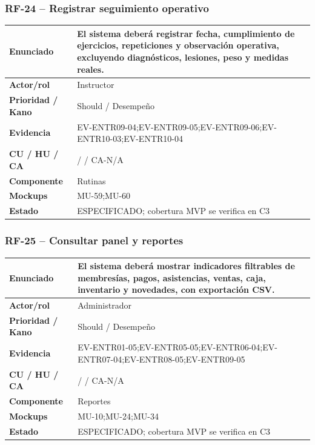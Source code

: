 \documentclass[11pt,a4paper,twoside]{article}
\begin{document}
\subsubsection{RF-24 -- Registrar seguimiento operativo}
\begin{tabularx}{\textwidth}{|>{\bfseries}p{3.2cm}|X|}\hline
Enunciado & El sistema deberá registrar fecha, cumplimiento de ejercicios, repeticiones y observación operativa, excluyendo diagnósticos, lesiones, peso y medidas reales. \\ \hline
Actor/rol & Instructor \\ \hline
Prioridad / Kano & Should / Desempeño \\ \hline
Evidencia & EV-ENTR09-04;EV-ENTR09-05;EV-ENTR09-06;EV-ENTR10-03;EV-ENTR10-04 \\ \hline
CU / HU / CA &  /  / CA-N/A \\ \hline
Componente & Rutinas \\ \hline
Mockups & MU-59;MU-60 \\ \hline
Estado & ESPECIFICADO; cobertura MVP se verifica en C3 \\ \hline
\end{tabularx}
\subsubsection{RF-25 -- Consultar panel y reportes}
\begin{tabularx}{\textwidth}{|>{\bfseries}p{3.2cm}|X|}\hline
Enunciado & El sistema deberá mostrar indicadores filtrables de membresías, pagos, asistencias, ventas, caja, inventario y novedades, con exportación CSV. \\ \hline
Actor/rol & Administrador \\ \hline
Prioridad / Kano & Should / Desempeño \\ \hline
Evidencia & EV-ENTR01-05;EV-ENTR05-05;EV-ENTR06-04;EV-ENTR07-04;EV-ENTR08-05;EV-ENTR09-05 \\ \hline
CU / HU / CA &  /  / CA-N/A \\ \hline
Componente & Reportes \\ \hline
Mockups & MU-10;MU-24;MU-34 \\ \hline
Estado & ESPECIFICADO; cobertura MVP se verifica en C3 \\ \hline
\end{tabularx}
\end{document}
